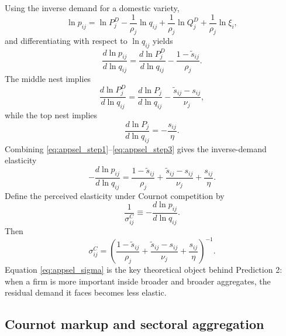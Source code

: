 Using the inverse demand for a domestic variety,
\[
\ln p_{ij}
=
\ln P_j^D
- \frac{1}{\rho_j}\ln q_{ij}
+ \frac{1}{\rho_j}\ln Q_j^D
+ \frac{1}{\rho_j}\ln \xi_i,
\]
and differentiating with respect to $\ln q_{ij}$ yields
\begin{equation}
\frac{d \ln p_{ij}}{d \ln q_{ij}}
=
\frac{d \ln P_j^D}{d \ln q_{ij}}
- \frac{1-\tilde{s}_{ij}}{\rho_j}.
\label{eq:appsel_step1}
\end{equation}
The middle nest implies
\begin{equation}
\frac{d \ln P_j^D}{d \ln q_{ij}}
=
\frac{d \ln P_j}{d \ln q_{ij}}
- \frac{\tilde{s}_{ij}-s_{ij}}{\nu_j},
\label{eq:appsel_step2}
\end{equation}
while the top nest implies
\begin{equation}
\frac{d \ln P_j}{d \ln q_{ij}} = -\frac{s_{ij}}{\eta}.
\label{eq:appsel_step3}
\end{equation}
Combining \eqref{eq:appsel_step1}--\eqref{eq:appsel_step3} gives the inverse-demand elasticity
\begin{equation}
-\frac{d \ln p_{ij}}{d \ln q_{ij}}
=
\frac{1-\tilde{s}_{ij}}{\rho_j}
+
\frac{\tilde{s}_{ij}-s_{ij}}{\nu_j}
+
\frac{s_{ij}}{\eta}.
\label{eq:appsel_inv_elast}
\end{equation}
Define the perceived elasticity under Cournot competition by
\[
\frac{1}{\sigma_{ij}^C} \equiv -\frac{d \ln p_{ij}}{d \ln q_{ij}}.
\]
Then
\begin{equation}
\sigma_{ij}^C
=
\left(
\frac{1-\tilde{s}_{ij}}{\rho_j}
+
\frac{\tilde{s}_{ij}-s_{ij}}{\nu_j}
+
\frac{s_{ij}}{\eta}
\right)^{-1}.
\label{eq:appsel_sigma}
\end{equation}
Equation \eqref{eq:appsel_sigma} is the key theoretical object behind Prediction 2: when a firm is more important inside broader and broader aggregates, the residual demand it faces becomes less elastic.

\subsection{Cournot markup and sectoral aggregation}

